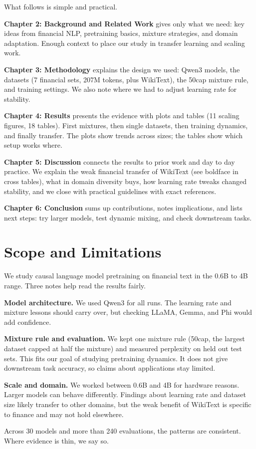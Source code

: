 What follows is simple and practical.

\textbf{Chapter 2: Background and Related Work} gives only what we need: key ideas from financial NLP, pretraining basics, mixture strategies, and domain adaptation. Enough context to place our study in transfer learning and scaling work.

\textbf{Chapter 3: Methodology} explains the design we used: Qwen3 models, the datasets (7 financial sets, 207M tokens, plus WikiText), the 50cap mixture rule, and training settings. We also note where we had to adjust learning rate for stability.

\textbf{Chapter 4: Results} presents the evidence with plots and tables (11 scaling figures, 18 tables). First mixtures, then single datasets, then training dynamics, and finally transfer. The plots show trends across sizes; the tables show which setup works where.

\textbf{Chapter 5: Discussion} connects the results to prior work and day to day practice. We explain the weak financial transfer of WikiText (see boldface in cross tables), what in domain diversity buys, how learning rate tweaks changed stability, and we close with practical guidelines with exact references.

\textbf{Chapter 6: Conclusion} sums up contributions, notes implications, and lists next steps: try larger models, test dynamic mixing, and check downstream tasks.

\section{Scope and Limitations}

We study causal language model pretraining on financial text in the 0.6B to 4B range. Three notes help read the results fairly.

\textbf{Model architecture.} We used Qwen3 for all runs. The learning rate and mixture lessons should carry over, but checking LLaMA, Gemma, and Phi would add confidence.

\textbf{Mixture rule and evaluation.} We kept one mixture rule (50cap, the largest dataset capped at half the mixture) and measured perplexity on held out test sets. This fits our goal of studying pretraining dynamics. It does not give downstream task accuracy, so claims about applications stay limited.

\textbf{Scale and domain.} We worked between 0.6B and 4B for hardware reasons. Larger models can behave differently. Findings about learning rate and dataset size likely transfer to other domains, but the weak benefit of WikiText is specific to finance and may not hold elsewhere.

Across 30 models and more than 240 evaluations, the patterns are consistent. Where evidence is thin, we say so.
